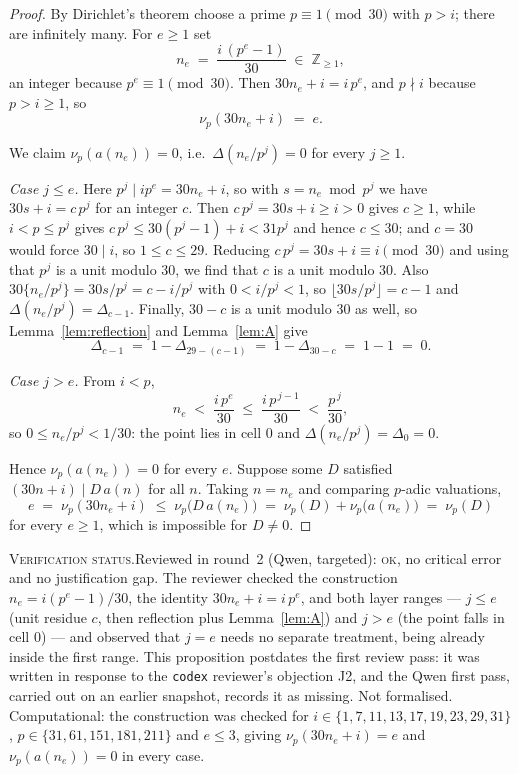 \documentclass[11pt]{article}
\theoremstyle{plain}
\theoremstyle{definition}
\theoremstyle{remark}
\numberwithin{equation}{section}
\newcommand{\Z}{\mathbb{Z}}
\newcommand{\vstatus}[1]{%
  \par\vspace{3pt}\noindent
  {\small\textsc{Verification status.}\enspace #1}\par\vspace{3pt}}
\begin{document}
\begin{proof}
By Dirichlet's theorem choose a prime $p \equiv 1 \pmod{30}$ with $p > i$; there are infinitely
many. For $e \ge 1$ set
\[
  n_e \;=\; \frac{i\,(p^e-1)}{30} \;\in\; \Z_{\ge 1},
\]
an integer because $p^e \equiv 1 \pmod{30}$. Then $30 n_e + i = i\,p^e$, and $p \nmid i$ because
$p > i \ge 1$, so
\[
  \nu_p(30n_e + i) \;=\; e .
\]

We claim $\nu_p(a(n_e)) = 0$, i.e.\ $\Delta(n_e/p^j) = 0$ for every $j \ge 1$.

\emph{Case $j \le e$.} Here $p^j \mid i p^e = 30n_e + i$, so with $s = n_e \bmod p^j$ we have
$30s + i = c\,p^j$ for an integer $c$. Then $c\,p^j = 30s+i \ge i > 0$ gives $c \ge 1$, while
$i < p \le p^j$ gives $c\,p^j \le 30(p^j-1) + i < 31 p^j$ and hence $c \le 30$; and $c = 30$
would force $30 \mid i$, so $1 \le c \le 29$. Reducing $c\,p^j = 30s + i \equiv i \pmod{30}$ and using that
$p^j$ is a unit modulo $30$, we find that $c$ is a unit modulo $30$. Also
$30\{n_e/p^j\} = 30 s/p^j = c - i/p^j$ with $0 < i/p^j < 1$, so $\lfloor 30 s/p^j\rfloor = c-1$
and $\Delta(n_e/p^j) = \Delta_{c-1}$. Finally, $30 - c$ is a unit modulo $30$ as well, so
Lemma~\ref{lem:reflection} and Lemma~\ref{lem:A} give
\[
  \Delta_{c-1} \;=\; 1 - \Delta_{29-(c-1)} \;=\; 1 - \Delta_{30-c} \;=\; 1 - 1 \;=\; 0 .
\]

\emph{Case $j > e$.} From $i < p$,
\[
  n_e \;<\; \frac{i\,p^e}{30} \;\le\; \frac{i\,p^{\,j-1}}{30} \;<\; \frac{p^{\,j}}{30},
\]
so $0 \le n_e/p^j < 1/30$: the point lies in cell $0$ and $\Delta(n_e/p^j) = \Delta_0 = 0$.

Hence $\nu_p(a(n_e)) = 0$ for every $e$. Suppose some $D$ satisfied $(30n+i) \mid D\,a(n)$ for
all $n$. Taking $n = n_e$ and comparing $p$-adic valuations,
\[
  e \;=\; \nu_p(30n_e+i) \;\le\; \nu_p\bigl(D\,a(n_e)\bigr)
  \;=\; \nu_p(D) + \nu_p\bigl(a(n_e)\bigr) \;=\; \nu_p(D)
\]
for every $e \ge 1$, which is impossible for $D \ne 0$.
\end{proof}
\vstatus{Reviewed in round~2 (Qwen, targeted): \textsc{ok}, no critical error and no
justification gap. The reviewer checked the construction $n_e = i(p^e-1)/30$, the identity
$30n_e+i = i\,p^e$, and both layer ranges --- $j \le e$ (unit residue $c$, then reflection plus
Lemma~\ref{lem:A}) and $j > e$ (the point falls in cell $0$) --- and observed that $j=e$ needs no
separate treatment, being already inside the first range. This proposition postdates the first
review pass: it was written in response to the \texttt{codex} reviewer's objection J2, and the
Qwen first pass, carried out on an earlier snapshot, records it as missing. Not formalised.
Computational: the construction was checked for
$i \in \{1,7,11,13,17,19,23,29,31\}$, $p \in \{31,61,151,181,211\}$ and $e \le 3$, giving
$\nu_p(30n_e+i) = e$ and $\nu_p(a(n_e)) = 0$ in every case.}
\end{document}

